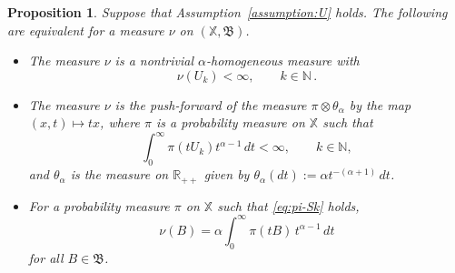 \documentclass[12pt]{amsart}
\numberwithin{equation}{section}
\numberwithin{figure}{section}
\theoremstyle{plain} \newtheorem{theorem}{Theorem}[section]
\theoremstyle{plain} \newtheorem{proposition}[theorem]{Proposition}
\theoremstyle{plain} \newtheorem{lemma}[theorem]{Lemma}
\theoremstyle{plain} \newtheorem{corollary}[theorem]{Corollary}
\theoremstyle{definition} \newtheorem{definition}[theorem]{Definition}
\theoremstyle{definition} \newtheorem{notation}[theorem]{Notation}
\theoremstyle{remark} \newtheorem{remark}[theorem]{Remark}
\theoremstyle{remark} \newtheorem{example}[theorem]{Example}
\theoremstyle{definition} \newtheorem{assumption}{Assumption}
\newcommand{\bN}{\mathbb{N}}
\newcommand{\bR}{\mathbb{R}}
\newcommand{\bX}{\mathbb{X}}
\newcommand{\salg}{\mathfrak{B}}
\begin{document}
\begin{proposition}
  \label{proposition:renorm}
  Suppose that Assumption~\ref{assumption:U} holds.
  The following are equivalent for a measure $\nu$ on $(\bX, \salg)$.
  \begin{itemize}
  \item[i)]
    The measure $\nu$ is a nontrivial $\alpha$-homogeneous measure with
    \begin{equation}
      \label{Eq:nu-finite}
      \nu(U_k)<\infty,\qquad k\in\bN\,.
    \end{equation}
  \item[ii)] The measure $\nu$ is the push-forward of the measure
    $\pi\otimes\theta_\alpha$ by the map $(x,t)\mapsto tx$, where
    $\pi$ is a probability measure on $\bX$ such that
    \begin{equation}
      \label{eq:pi-Sk}
      \int_0^\infty \pi(tU_k)t^{\alpha-1} \, dt < \infty,\qquad k\in\bN,
    \end{equation}
    and $\theta_\alpha$ is the measure on $\bR_{++}$ given by 
    $\theta_\alpha(dt) := \alpha t^{-(\alpha+1)} \, dt$.
  \item[(iii)] For a probability measure $\pi$ on $\bX$ such that
    \eqref{eq:pi-Sk} holds,
    \begin{equation}
      \label{Eq:nu-rep}
      \nu(B) = \alpha \int_0^\infty \pi(t B) \, t^{\alpha-1} \, dt
    \end{equation}
    for all $B \in \salg$.
  \end{itemize}
\end{proposition}
	
\end{document}
